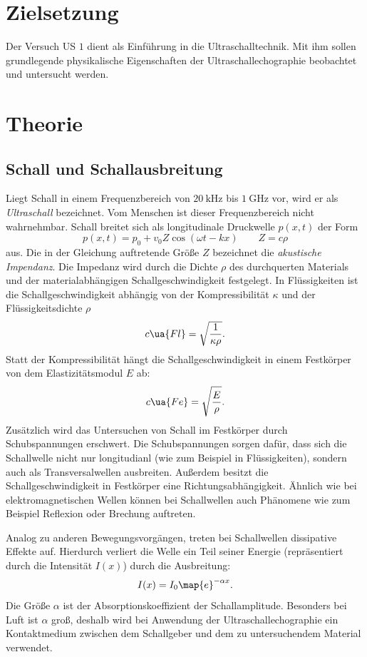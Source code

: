 \setcounter{page}{1}
\section*{Zielsetzung}
Der Versuch US $1$ dient als Einführung in die Ultraschalltechnik.
Mit ihm sollen grundlegende physikalische Eigenschaften der
Ultraschallechographie beobachtet und untersucht werden.
\section{Theorie}
\subsection{Schall und Schallausbreitung}
Liegt Schall in einem Frequenzbereich von $\SI{20}{\kilo\hertz}$ bis $\SI{1}{\giga\hertz}$ vor,
wird er als \emph{Ultraschall} bezeichnet. Vom Menschen ist dieser Frequenzbereich nicht wahrnehmbar.
Schall breitet sich als longitudinale Druckwelle $p(x,t)$ der Form
\begin{equation*}
  p(x,t)=p_0+v_0 Z \cos(\omega t - kx) \qquad Z=c\rho
\end{equation*}
aus. Die in der Gleichung auftretende Größe $Z$ bezeichnet die \emph{akustische Impendanz}.
Die Impedanz wird durch die Dichte $\rho$ des durchquerten Materials und der
materialabhängigen Schallgeschwindigkeit festgelegt.
In Flüssigkeiten ist die Schallgeschwindigkeit abhängig von der
Kompressibilität $\kappa$ und der Flüssigkeitsdichte $\rho$
\begin{equation*}
  c\ua{Fl}=\sqrt{\frac{1}{\kappa\rho}}.
\end{equation*}
Statt der Kompressibilität hängt die Schallgeschwindigkeit in einem Festkörper von
dem Elastizitätsmodul $E$ ab:
\begin{equation*}
  c\ua{Fe}=\sqrt{\frac{E}{\rho}}.
\end{equation*}
Zusätzlich wird das Untersuchen von Schall im Festkörper durch Schubspannungen
erschwert. Die Schubspannungen sorgen dafür, dass sich die Schallwelle nicht nur
longitudianl (wie zum Beispiel in Flüssigkeiten), sondern auch als %
Transversalwellen ausbreiten.
Außerdem besitzt die Schallgeschwindigkeit in Festkörper eine Richtungsabhängigkeit. %
Ähnlich wie bei elektromagnetischen Wellen können bei Schallwellen auch
Phänomene wie zum Beispiel Reflexion oder Brechung auftreten.

Analog zu anderen Bewegungsvorgängen, treten bei Schallwellen dissipative Effekte auf.
Hierdurch verliert die Welle ein Teil seiner Energie (repräsentiert durch die Intensität $I(x)$) durch die Ausbreitung: %
\begin{equation}
  \label{eq:abfall}
  I(x)=I_0\map{e}^{-\alpha x}.
\end{equation}
Die Größe $\alpha$ ist der Absorptionskoeffizient der Schallamplitude.
Besonders bei Luft ist $\alpha$ groß, deshalb wird bei Anwendung der Ultraschallechographie
ein Kontaktmedium zwischen dem Schallgeber und dem zu untersuchendem Material verwendet.

